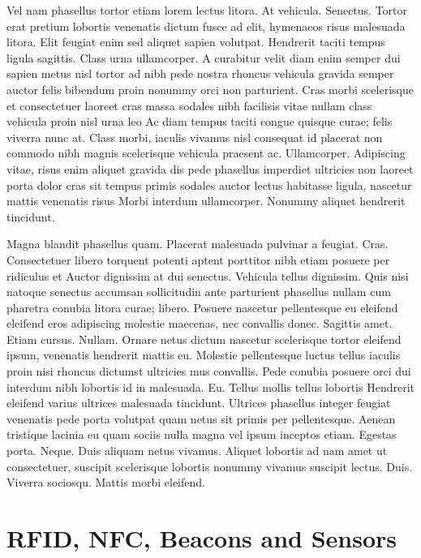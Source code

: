 Vel nam phasellus tortor etiam lorem lectus litora. At vehicula. Senectus. Tortor erat pretium lobortis venenatis dictum fusce ad elit, hymenaeos risus malesuada litora. Elit feugiat enim sed aliquet sapien volutpat. Hendrerit taciti tempus ligula sagittis. Class urna ullamcorper. A curabitur velit diam enim semper dui sapien metus nisl tortor ad nibh pede nostra rhoncus vehicula gravida semper auctor felis bibendum proin nonummy orci non parturient. Cras morbi scelerisque et consectetuer laoreet cras massa sodales nibh facilisis vitae nullam class vehicula proin nisl urna leo Ac diam tempus taciti congue quisque curae; felis viverra nunc at. Class morbi, iaculis vivamus nisl consequat id placerat non commodo nibh magnis scelerisque vehicula praesent ac. Ullamcorper. Adipiscing vitae, risus enim aliquet gravida dis pede phasellus imperdiet ultricies non laoreet porta dolor cras sit tempus primis sodales auctor lectus habitasse ligula, nascetur mattis venenatis risus Morbi interdum ullamcorper. Nonummy aliquet hendrerit tincidunt.

Magna blandit phasellus quam. Placerat malesuada pulvinar a feugiat. Cras. Consectetuer libero torquent potenti aptent porttitor nibh etiam posuere per ridiculus et Auctor dignissim at dui senectus. Vehicula tellus dignissim. Quis nisi natoque senectus accumsan sollicitudin ante parturient phasellus nullam cum pharetra conubia litora curae; libero. Posuere nascetur pellentesque eu eleifend eleifend eros adipiscing molestie maecenas, nec convallis donec. Sagittis amet. Etiam cursus. Nullam. Ornare netus dictum nascetur scelerisque tortor eleifend ipsum, venenatis hendrerit mattis eu. Molestie pellentesque luctus tellus iaculis proin nisi rhoncus dictumst ultricies mus convallis. Pede conubia posuere orci dui interdum nibh lobortis id in malesuada. Eu. Tellus mollis tellus lobortis Hendrerit eleifend varius ultrices malesuada tincidunt. Ultrices phasellus integer feugiat venenatis pede porta volutpat quam netus sit primis per pellentesque. Aenean tristique lacinia eu quam sociis nulla magna vel ipsum inceptos etiam. Egestas porta. Neque. Duis aliquam netus vivamus. Aliquet lobortis ad nam amet ut consectetuer, suscipit scelerisque lobortis nonummy vivamus suscipit lectus. Duis. Viverra sociosqu. Mattis morbi eleifend.

\section{RFID, NFC, Beacons and Sensors}


